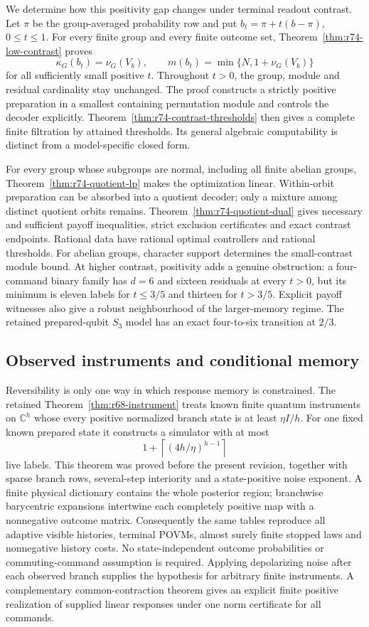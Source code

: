 We determine how this positivity gap changes under terminal readout
contrast. Let $\pi$ be the group-averaged probability row and put
$b_t=\pi+t(b-\pi)$, $0\le t\le1$. For every finite group and every
finite outcome set, Theorem~\ref{thm:r74-low-contrast} proves
\[
 \kappa_G(b_t)=\nu_G(V_b),\qquad
 m(b_t)=\min\{N,1+\nu_G(V_b)\}
\]
for all sufficiently small positive $t$. Throughout $t>0$, the group,
module and residual cardinality stay unchanged. The proof constructs a
strictly positive preparation in a smallest containing permutation module
and controls the decoder explicitly. Theorem~\ref{thm:r74-contrast-thresholds}
then gives a complete finite filtration by attained thresholds. Its general
algebraic computability is distinct from a model-specific closed form.

For every group whose subgroups are normal, including all finite abelian
groups, Theorem~\ref{thm:r74-quotient-lp} makes the optimization linear.
Within-orbit preparation can be absorbed into a quotient decoder; only a
mixture among distinct quotient orbits remains. Theorem~\ref{thm:r74-quotient-dual}
gives necessary and sufficient payoff inequalities, strict exclusion
certificates and exact contrast endpoints. Rational data have rational
optimal controllers and rational thresholds. For abelian groups, character
support determines the small-contrast module bound. At higher contrast,
positivity adds a genuine obstruction: a four-command binary family has
$d=6$ and sixteen residuals at every $t>0$, but its minimum is eleven
labels for $t\le3/5$ and thirteen for $t>3/5$. Explicit payoff witnesses also
give a robust neighbourhood of the larger-memory regime. The retained
prepared-qubit $S_3$ model has an exact four-to-six transition at $2/3$.

\subsection*{Observed instruments and conditional memory}
Reversibility is only one way in which response memory is constrained.
The retained Theorem~\ref{thm:r68-instrument} treats known finite quantum instruments
on $\mathbb C^h$ whose every positive normalized branch state is at least
$\eta I/h$. For one fixed known prepared state it constructs a simulator
with at most
\[
 1+\left\lceil(4h/\eta)^{h-1}\right\rceil
\]
live labels. This theorem was proved before the present revision, together with sparse
branch rows, several-step interiority and a state-positive noise exponent.
A finite physical dictionary contains the whole posterior
region; branchwise barycentric expansions intertwine each completely
positive map with a nonnegative outcome matrix. Consequently the same
tables reproduce all adaptive visible histories, terminal POVMs, almost surely finite stopped
laws and nonnegative history costs. No state-independent outcome
probabilities or commuting-command assumption is required. Applying
depolarizing noise after each observed branch supplies the hypothesis for
arbitrary finite instruments. A complementary common-contraction theorem
gives an explicit finite positive realization of supplied linear responses
under one norm certificate for all commands.

